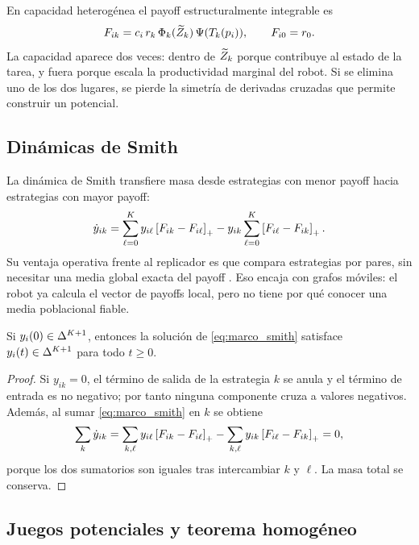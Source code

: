 En capacidad heterogénea el payoff estructuralmente integrable es
\begin{equation}
  F_{ik}=c_i\,r_k\,\Phi_k(\widetilde{Z}_k)\,\Psi(T_k(p_i)),
  \qquad F_{i0}=r_0.
  \label{eq:marco_payoff_hetero}
\end{equation}
La capacidad aparece dos veces: dentro de $\widetilde{Z}_k$ porque contribuye al estado de la
tarea, y fuera porque escala la productividad marginal del robot. Si se elimina uno de
los dos lugares, se pierde la simetría de derivadas cruzadas que permite construir un
potencial.

\subsection{Dinámicas de Smith}

La dinámica de Smith transfiere masa desde estrategias con menor payoff hacia
estrategias con mayor payoff:
\begin{equation}
  \dot y_{ik}
  =
  \sum_{\ell=0}^{K} y_{i\ell}\left[F_{ik}-F_{i\ell}\right]_{+}
  -
  y_{ik}\sum_{\ell=0}^{K}\left[F_{i\ell}-F_{ik}\right]_{+}.
  \label{eq:marco_smith}
\end{equation}
Su ventaja operativa frente al replicador es que compara estrategias por pares, sin
necesitar una media global exacta del payoff \citep{sandholm2010population,
quijano2017population}. Eso encaja con grafos móviles: el robot ya calcula el vector de
payoffs local, pero no tiene por qué conocer una media poblacional fiable.

\begin{lema}
Si $y_i(0)\in\Delta^{K+1}$, entonces la solución de
\eqref{eq:marco_smith} satisface $y_i(t)\in\Delta^{K+1}$ para todo $t\ge0$.
\end{lema}

\begin{proof}
Si $y_{ik}=0$, el término de salida de la estrategia $k$ se anula y el término de
entrada es no negativo; por tanto ninguna componente cruza a valores negativos. Además,
al sumar \eqref{eq:marco_smith} en $k$ se obtiene
\[
  \sum_k\dot y_{ik}
  =
  \sum_{k,\ell}y_{i\ell}\left[F_{ik}-F_{i\ell}\right]_{+}
  -
  \sum_{k,\ell}y_{ik}\left[F_{i\ell}-F_{ik}\right]_{+}=0,
\]
porque los dos sumatorios son iguales tras intercambiar $k$ y $\ell$. La masa total se
conserva.
\end{proof}

\subsection{Juegos potenciales y teorema homogéneo}

